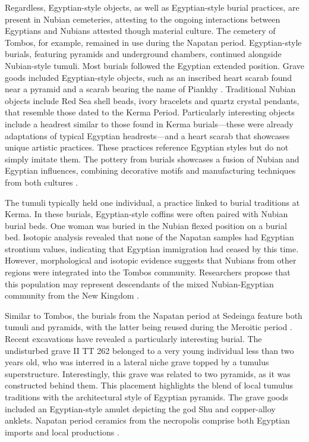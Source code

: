 Regardless, Egyptian-style objects, as well as Egyptian-style burial practices, are present in Nubian cemeteries, attesting to the ongoing interactions between Egyptians and Nubians attested though material culture.	The cemetery of Tombos, for example, remained in use during the Napatan period. Egyptian-style burials, featuring pyramids and underground chambers, continued alongside Nubian-style tumuli. Most burials followed the Egyptian extended position. Grave goods included Egyptian-style objects, such as an inscribed heart scarab found near a pyramid and a scarab bearing the name of Piankhy \parencite[p.~293-294]{buzonEntanglementFormationAncient2016}. Traditional Nubian objects include Red Sea shell beads, ivory bracelets and quartz crystal pendants, that resemble those dated to the Kerma Period. Particularly interesting objects include a headrest similar to those found in Kerma burials—these were already adaptations of typical Egyptian headrests—and a heart scarab that showcases unique artistic practices. These practices reference Egyptian styles but do not simply imitate them. The pottery from burials showcases a fusion of Nubian and Egyptian influences, combining decorative motifs and manufacturing techniques from both cultures \parencites[p.~6-9]{smithColonialEntanglementsEgyptianization2014}[p.~637-642]{buzonTumuliTombosInnovation2023}.

The tumuli typically held one individual, a practice linked to burial traditions at Kerma. In these burials, Egyptian-style coffins were often paired with Nubian burial beds. One woman was buried in the Nubian flexed position on a burial bed. Isotopic analysis revealed that none of the Napatan samples had Egyptian strontium values, indicating that Egyptian immigration had ceased by this time. However, morphological and isotopic evidence suggests that Nubians from other regions were integrated into the Tombos community. Researchers propose that this population may represent descendants of the mixed Nubian-Egyptian community from the New Kingdom \parencites{schraderIlluminatingNubianDark2014}[p.~294-295]{buzonEntanglementFormationAncient2016}{buzonTumuliTombosInnovation2023}{buzonExploringIntersectionalIdentities2024}{smithCrossCulturalInteractionAncient2018}.

Similar to Tombos, the burials from the Napatan period at Sedeinga feature both tumuli and pyramids, with the latter being reused during the Meroitic period \parencites{berger-elnaggarContributionSedeingaLhistoire2008}{rillyCloserAncestorsExcavations2018}. Recent excavations have revealed a particularly interesting burial. The undisturbed grave II TT 262 belonged to a very young individual less than two years old, who was interred in a lateral niche grave topped by a tumulus superstructure. Interestingly, this grave was related to two pyramids, as it was constructed behind them. This placement highlights the blend of local tumulus traditions with the architectural style of Egyptian pyramids. The grave goods included an Egyptian-style amulet depicting the god Shu and copper-alloy anklets. Napatan period ceramics from the necropolis comprise both Egyptian imports and local productions \parencites{rillySedeinga2012Season2013, rillyCloserAncestorsExcavations2018, rillyCollectiveGravesBastatues2020}.


